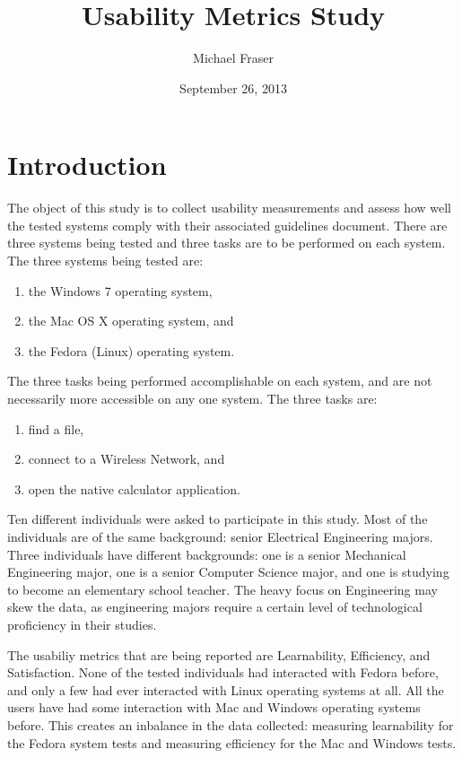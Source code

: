 \documentclass[11pt,a4paper]{report}
\begin{document}
\title{Usability Metrics Study}
\author{Michael Fraser}
\date{September 26, 2013}
\maketitle

\section{Introduction}

The object of this study is to collect usability measurements and assess how well the tested systems comply with their associated guidelines document. There are three systems being tested and three tasks are to be performed on each system. The three systems being tested are:
\begin{enumerate}
\item the Windows 7 operating system, 
\item the Mac OS X operating system, and
\item the Fedora (Linux) operating system. 
\end{enumerate}

The three tasks being performed accomplishable on each system, and are not necessarily more accessible on any one system. The three tasks are:
\begin{enumerate}
\item find a file,
\item connect to a Wireless Network, and
\item open the native calculator application.
\end{enumerate}

Ten different individuals were asked to participate in this study. Most of the individuals are of the same background: senior Electrical Engineering majors. Three individuals have different backgrounds: one is a senior Mechanical Engineering major, one is a senior Computer Science major, and one is studying to become an elementary school teacher. The heavy focus on Engineering may skew the data, as engineering majors require a certain level of technological proficiency in their studies. 

The usabiliy metrics that are being reported are Learnability, Efficiency, and Satisfaction. None of the tested individuals had interacted with Fedora before, and only a few had ever interacted with Linux operating systems at all. All the users have had some interaction with Mac and Windows operating systems before. This creates an inbalance in the data collected: measuring learnability for the Fedora system tests and measuring efficiency for the Mac and Windows tests. 
\end{document}
